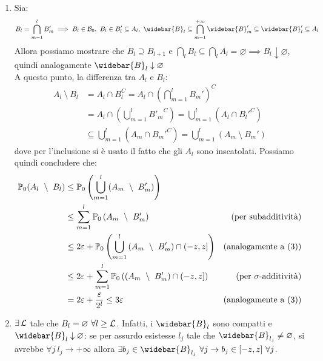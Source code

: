 \begin{dimo}
\begin{enumerate}
    \item Sia:
      $$B_l = \bigcap_{m=1}^l B_m' \implies B_l \in \Bc_0, \ B_l \in B_l' \subseteq A_l, \ \widebar{B}_l \subseteq \bigcap_{m=1}^{+\infty} \widebar{B}_m' \subseteq \widebar{B}_l' \subseteq A_l $$
      Allora possiamo mostrare che $B_l \supseteq B_{l+1} \text{ e } \bigcap_l B_l \subseteq \bigcap_l A_l = \varnothing \implies B_l \downarrow \varnothing$, quindi analogamente $\widebar{B}_l \downarrow \varnothing$\\
      A questo punto, la differenza tra $A_l$ e $B_l$:
      \begin{align*}
        A_l \ \setminus \ B_l &= A_l \cap B_l^C = A_l \cap \left( \bigcap_{m=1}^l B_m' \right)^C \\
        &= A_l \cap \left(\bigcup_{m=1}^l {B'_m}^C \right) = \bigcup_{m=1}^l \left( A_l \cap {B_l'}^C \right)\\
        &\subseteq \bigcup_{m=1}^l \left( A_m \cap {B_m'}^C \right) = \bigcup_{m=1}^l \left(A_m \ \setminus \ B_m'\right)
      \end{align*}
      dove per l'inclusione si è usato il fatto che gli $A_l$ sono inscatolati.
      Possiamo quindi concludere che:
      \begin{align*}
        \PP_0( A_l \ \setminus \ B_l) &\le \PP_0 \left( \bigcup_{m=1}^l (A_m \ \setminus \ B_m' ) \right) \\
        &\le \sum_{m=1}^l \PP_0 \left( A_m \ \setminus \ B_m'\right) & (\text{per subadditività})\\
        &\le 2 \varepsilon + \PP_0 \left( \bigcup_{m=1}^l \left(A_m \ \setminus \ B_m' \right) \cap (-z,z] \right) & (\text{analogamente a (3)})\\
        &\le 2 \varepsilon + \sum_{m=1}^l \PP_0  \left( \left(A_m \ \setminus \ B_m' \right) \cap (-z,z] \right) & (\text{per $\sigma$-additività})\\
        &= 2 \varepsilon + \dfrac{\varepsilon}{2^l} \le 3 \varepsilon & (\text{analogamente a (3)})
      \end{align*}

    \item $\exists \, \mathcal L$ tale che $B_l = \varnothing \ \forall l \ge \mathcal L $. Infatti, i $\widebar{B}_l$ sono compatti e
      $\widebar{B}_l \downarrow \varnothing$: se per assurdo esistesse $ l_j$ tale che $\widebar{B}_{l_j} \ne \varnothing$, si avrebbe $\forall j \ l_j \to +\infty$ allora $\exists b_j \in \widebar{B}_{l_j} \ \forall j \to b_j \in [-z, z] \ \forall j $.


\end{enumerate}
\end{dimo}

